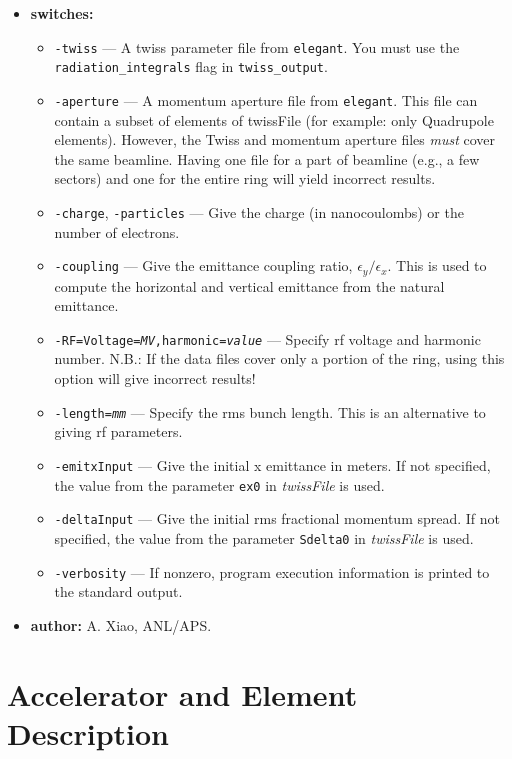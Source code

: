 \documentclass[11pt]{article}
\begin{document}
\begin{itemize}
\item {\bf switches:}
\begin{itemize}
\item {\tt -twiss} --- A twiss parameter file from {\tt elegant}. 
You must use the \verb|radiation_integrals| flag in \verb|twiss_output|.
\item {\tt -aperture} --- A momentum aperture file from {\tt elegant}.
This file can contain a subset of elements of twissFile (for example:
only Quadrupole elements).  However, the Twiss and momentum aperture
files {\em must} cover the same beamline. Having one file for a part
of beamline (e.g., a few sectors) and one for the entire ring will
yield incorrect results.
\item {\tt -charge}, {\tt -particles} --- Give the charge (in nanocoulombs) or the
 number of electrons.
\item {\tt -coupling} --- Give the emittance coupling ratio, $\epsilon_y/\epsilon_x$.  This is
 used to compute the horizontal and vertical emittance from the natural emittance.
\item {\tt -RF=Voltage={\em MV},harmonic={\em value}} --- Specify rf voltage and harmonic number.
 N.B.: If the data files cover only a portion of the ring, using this option will give incorrect results!
\item {\tt -length={\em mm}} --- Specify the rms bunch length.  This is an alternative to giving rf parameters.
\item {\tt -emitxInput} --- Give the initial x emittance in meters.  If not specified,
the value from the parameter \verb|ex0| in {\em twissFile} is used.
\item {\tt -deltaInput} --- Give the initial rms fractional momentum spread.  If not
specified, the value from the parameter \verb|Sdelta0| in {\em twissFile} is used.
\item {\tt -verbosity} --- If nonzero, program execution information is printed to the standard output.
\end{itemize}

\item {\bf author:} A. Xiao, ANL/APS.

\end{itemize}

\newpage 

\section{Accelerator and Element Description}
\end{document}
